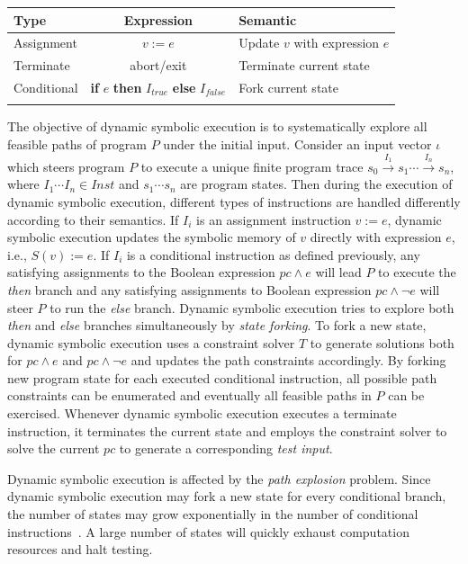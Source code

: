 \documentclass{cta-author}
\begin{document}
\begin{table}[!b]
	{\begin{tabular*}{20pc}{@{\extracolsep{\fill}}lcl@{}}\toprule
			Type  & Expression & Semantic\\
			\midrule
			Assignment   &  $v:=e$ & Update $v$ with expression $e$\\
			Terminate    &  abort/exit & Terminate current state \\
			Conditional  &  \textbf{if} $e$ \textbf{then} $I_{true}$ \textbf{else} $I_{false}$ & Fork current state\\
			\botrule
		\end{tabular*}}{}
	\end{table}
	
The objective of dynamic symbolic execution is to systematically
explore all feasible paths of program $P$ under the initial input.
Consider an input vector $\iota$ which steers program $P$ to execute a
unique finite program trace
$s_0\xrightarrow{I_1}s_1\cdots\xrightarrow{I_n}s_n$, where $I_1\cdots
I_n\in Inst$ and $s_1\cdots s_n$ are program states. Then during the
execution of dynamic symbolic execution, different types of
instructions are handled differently according to their semantics. If
$I_i$ is an assignment instruction $v:=e$, dynamic symbolic execution
updates the symbolic memory of $v$ directly with expression $e$, i.e.,
$S(v):= e$. If $I_i$ is a conditional instruction as defined
previously, any satisfying assignments to the Boolean expression
$pc\wedge e$ will lead $P$ to execute the \textit{then} branch and any
satisfying assignments to Boolean expression $pc\wedge\neg e$ will
steer $P$ to run the \textit{else} branch. Dynamic symbolic execution
tries to explore both \textit{then} and \textit{else} branches
simultaneously by \textit{state forking}. To fork a new state, dynamic
symbolic execution uses a constraint solver $T$ to generate
solutions both for $pc\wedge e$ and $pc\wedge\neg e$ and updates the
path constraints accordingly. By forking new program state for each
executed conditional instruction, all possible path constraints can be
enumerated and eventually all feasible paths in $P$ can be exercised.
Whenever dynamic symbolic execution executes a terminate instruction,
it terminates the current state and employs the constraint solver to
solve the current $pc$ to generate a corresponding \textit{test input}.

Dynamic symbolic execution is affected by the \textit{path explosion}
problem. Since dynamic symbolic execution may fork a new state for
every conditional branch, the number of states may grow exponentially
in the number of conditional instructions~\cite{cadar2013symbolic}. A
large number of states will quickly exhaust computation resources and
halt testing.
\end{document}
